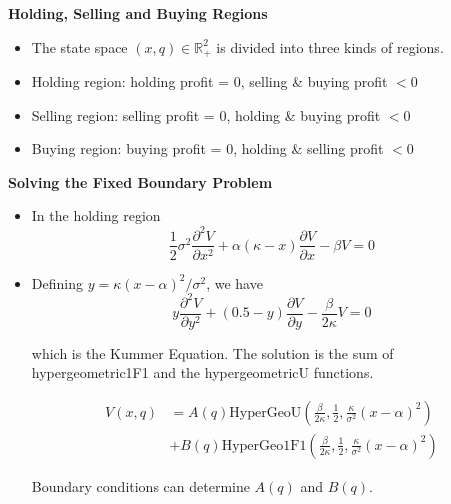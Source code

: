 \documentclass{beamer}
\begin{document}
\begin{frame}
{\bf Holding, Selling and Buying Regions}

\begin{itemize}
  \item The state space $(x,q) \in \mathbb{R}^2_+$ is divided into three kinds of regions.
  \item Holding region: holding profit = 0, selling \& buying profit $<0$
  \item Selling region: selling profit = 0, holding \& buying profit $<0$ 
  \item Buying region: buying profit = 0, holding \& selling profit $<0$
\end{itemize}

\end{frame}

\begin{frame}
{\bf Solving the Fixed Boundary Problem}
\begin{itemize}
  \item In the holding region
  \begin{equation*}
  \frac{1}{2} \sigma^2 \frac{\partial^2 V}{\partial x^2} + \alpha (\kappa - x) \frac{\partial V}{\partial x} - \beta V = 0
\end{equation*}

\item Defining $y = \kappa (x-\alpha)^2/\sigma^2$, we have
\begin{equation*}
  y \frac{\partial^2 V}{\partial y^2} + (0.5 - y) \frac{\partial V}{\partial y} -\frac{\beta}{2\kappa} V = 0
\end{equation*}

which is the Kummer Equation. The solution is the sum of hypergeometric1F1 and the hypergeometricU functions.

\begin{equation*}
\begin{split}
  V(x,q) &= A(q)\text{HyperGeoU}\left(\frac{\beta}{2\kappa},\frac{1}{2},\frac{\kappa}{\sigma^2}(x-\alpha)^2\right) \\
  &+ B(q)\text{HyperGeo1F1}\left(\frac{\beta}{2\kappa},\frac{1}{2},\frac{\kappa}{\sigma^2}(x-\alpha)^2\right)
  \end{split}
\end{equation*}

Boundary conditions can determine $A(q)$ and $B(q)$.

\end{itemize}

\end{frame}
\end{document}
